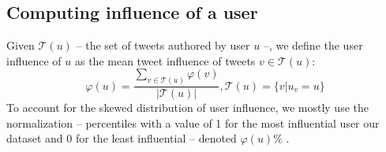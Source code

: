 %
%

\subsection{Computing influence of a user}
\label{subsec:user-influence-measure}

Given $\mathcal{T}(u)$ -- the set of tweets authored by user $u$ --, we define the user influence of $u$ as the mean tweet influence of tweets $v \in \mathcal{T}(u)$:
\begin{equation} \label{eq:user-infl-casin}
	\varphi(u) = \frac{\sum_{v \in \mathcal{T}(u)} \varphi(v)}{|\mathcal{T}(u)|}, \mathcal{T}(u) = \{ v | u_v = u\}
\end{equation}
To account for the skewed distribution of user influence, we mostly use the normalization --  percentiles with a value of 1 for the most influential user our dataset and 0 for the least influential -- denoted $\varphi(u) \%$ .
